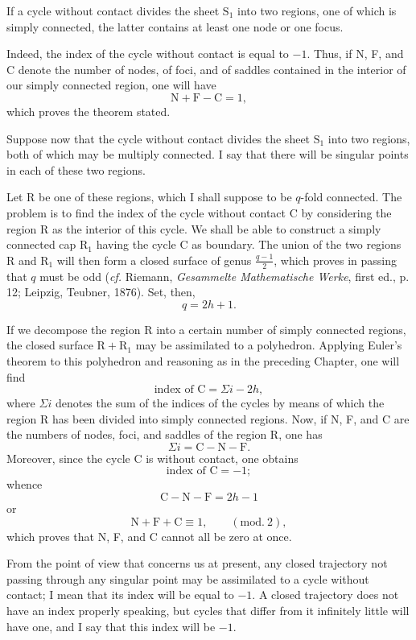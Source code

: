 \documentclass[11pt]{article}
\begin{document}
If a cycle without contact divides the sheet $\mathrm{S}_1$ into two regions, one of which is simply connected, the latter contains at least one node or one focus.

Indeed, the index of the cycle without contact is equal to $-1$. Thus, if N, F, and C denote the number of nodes, of foci, and of saddles contained in the interior of our simply connected region, one will have
\[
\mathrm{N}+\mathrm{F}-\mathrm{C}=1,
\]
which proves the theorem stated.

Suppose now that the cycle without contact divides the sheet $\mathrm{S}_1$ into two regions, both of which may be multiply connected. I say that there will be singular points in each of these two regions.

Let R be one of these regions, which I shall suppose to be $q$-fold connected. The problem is to find the index of the cycle without contact C by considering the region R as the interior of this cycle. We shall be able to construct a simply connected cap $\mathrm{R}_1$ having the cycle C as boundary. The union of the two regions R and $\mathrm{R}_1$ will then form a closed surface of genus $\frac{q-1}{2}$, which proves in passing that $q$ must be odd (\emph{cf.} Riemann, \emph{Gesammelte Mathematische Werke}, first ed., p. 12; Leipzig, Teubner, 1876). Set, then,
\[
q=2h+1.
\]

If we decompose the region R into a certain number of simply connected regions, the closed surface $\mathrm{R}+\mathrm{R}_1$ may be assimilated to a polyhedron. Applying Euler’s theorem to this polyhedron and reasoning as in the preceding Chapter, one will find
\[
\text{index of }\mathrm{C}=\Sigma i-2h,
\]
where $\Sigma i$ denotes the sum of the indices of the cycles by means of which the region R has been divided into simply connected regions. Now, if N, F, and C are the numbers of nodes, foci, and saddles of the region R, one has
\[
\Sigma i=\mathrm{C}-\mathrm{N}-\mathrm{F}.
\]
Moreover, since the cycle C is without contact, one obtains
\[
\text{index of }\mathrm{C}=-1;
\]
whence
\[
\mathrm{C}-\mathrm{N}-\mathrm{F}=2h-1
\]
or
\[
\mathrm{N}+\mathrm{F}+\mathrm{C}\equiv 1,\qquad (\mathrm{mod}.\ 2),
\]
which proves that N, F, and C cannot all be zero at once.

From the point of view that concerns us at present, any closed trajectory not passing through any singular point may be assimilated to a cycle without contact; I mean that its index will be equal to $-1$. A closed trajectory does not have an index properly speaking, but cycles that differ from it infinitely little will have one, and I say that this index will be $-1$.
\end{document}
